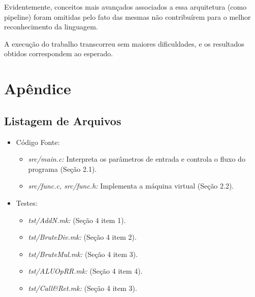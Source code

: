 \documentclass[12pt, a4paper]{article}
\begin{document}
Evidentemente, conceitos mais avançados associados a essa arquitetura (como pipeline) foram omitidas pelo fato das mesmas não contribuírem para o melhor reconhecimento da linguagem.

A execução do trabalho transcorreu sem maiores dificuldades, e os resultados obtidos correspondem ao esperado.

\appendix
\section{Apêndice}
\subsection{Listagem de Arquivos}
\begin{itemize}
	\item Código Fonte:
	\begin{itemize}
		\item \emph{src/main.c:} Interpreta os parâmetros de entrada e controla o fluxo do programa (Seção 2.1).
		\item \emph{src/func.c, src/func.h:} Implementa a máquina virtual (Seção 2.2).
	\end{itemize}
	\item Testes:
	\begin{itemize}
		\item \emph{tst/AddN.mk:} (Seção 4 item 1).
		\item \emph{tst/BruteDiv.mk:} (Seção 4 item 2).
		\item \emph{tst/BruteMul.mk:} (Seção 4 item 3).
		\item \emph{tst/ALUOpRR.mk:} (Seção 4 item 4).
		\item \emph{tst/Call{\&}Ret.mk:} (Seção 4 item 3).
	\end{itemize}
	
\end{itemize}
\end{document}
